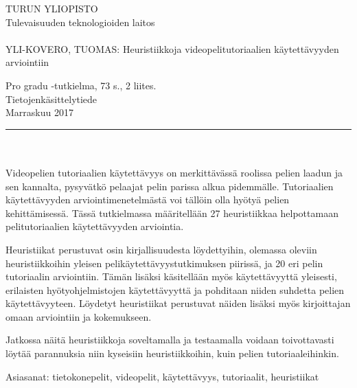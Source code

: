 \documentclass[12pt, a4paper]{report}
\begin{document}
\begin{minipage}{15cm}
	\noindent
	TURUN YLIOPISTO\\
	Tulevaisuuden teknologioiden laitos\\
	\\
	YLI-KOVERO, TUOMAS: Heuristiikkoja videopelitutoriaalien käytettävyyden arviointiin
	
	Pro gradu -tutkielma, 73 s., 2 liites.\\
	Tietojenkäsittelytiede\\	
	Marraskuu 2017\\
	\rule{\textwidth}{.2mm}\\
	\\
	Videopelien tutoriaalien käytettävyys on merkittävässä roolissa pelien laadun ja sen kannalta, pysyvätkö pelaajat pelin parissa alkua pidemmälle. Tutoriaalien käytettävyyden arviointimenetelmästä voi tällöin olla hyötyä pelien kehittämisessä. Tässä tutkielmassa määritellään 27 heuristiikkaa helpottamaan pelitutoriaalien käytettävyyden arviointia. 
	
	\vspace{4mm}\noindent Heuristiikat perustuvat osin kirjallisuudesta löydettyihin, olemassa oleviin heuris\-tiikkoihin yleisen pelikäytettävyystutkimuksen piirissä, ja 20 eri pelin tutoriaalin arviointiin. Tämän lisäksi käsitellään myös käytettävyyttä yleisesti, eri\-lais\-ten hyötyohjelmistojen käytettävyyttä ja pohditaan niiden suhdetta pelien käytettävyyteen. Löydetyt heuristiikat perustuvat näiden lisäksi myös kirjoittajan omaan arviointiin ja kokemukseen.
	
	\vspace{4mm}\noindent Jatkossa näitä heuristiikkoja soveltamalla ja testaamalla voidaan toivottavasti löytää parannuksia niin kyseisiin heuristiikkoihin, kuin pelien tutoriaaleihinkin.
	
	\vspace{4mm}\noindent Asiasanat: tietokonepelit, videopelit, käytettävyys, tutoriaalit, heuristiikat
	
\end{minipage}
\cleardoublepage
{}
\tableofcontents
\cleardoublepage
{}
\pagestyle{plain} 
\setcounter{page}{1}











\end{document}
